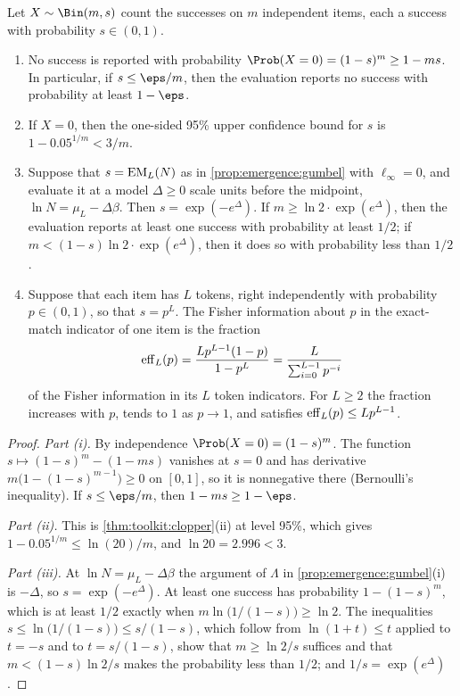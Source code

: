 \begin{refsection}
\begin{proposition}\label{prop:emergence:resolution}
Let $X\sim\Bin(m,s)$ count the successes on $m$ independent items, each a success with probability $s\in(0,1)$.
\begin{enumerate}
\item No success is reported with probability $\Prob(X=0)=(1-s)^m\ge1-ms$. In particular, if $s\le\eps/m$, then the evaluation reports no success with probability at least $1-\eps$.
\item If $X=0$, then the one-sided 95\% upper confidence bound for $s$ is $1-0.05^{1/m}<3/m$.
\item Suppose that $s=\mathrm{EM}_L(N)$ as in \cref{prop:emergence:gumbel} with $\ell_\infty=0$, and evaluate it at a model $\Delta\ge0$ scale units before the midpoint, $\ln N=\mu_L-\Delta\beta$. Then $s=\exp(-e^\Delta)$. If $m\ge\ln2\cdot\exp(e^\Delta)$, then the evaluation reports at least one success with probability at least $1/2$; if $m<(1-s)\ln2\cdot\exp(e^\Delta)$, then it does so with probability less than $1/2$.
\item Suppose that each item has $L$ tokens, right independently with probability $p\in(0,1)$, so that $s=p^L$. The Fisher information about $p$ in the exact-match indicator of one item is the fraction
\begin{equation}\label{eq:emergence:eff}
\mathrm{eff}_L(p)=\frac{Lp^{L-1}(1-p)}{1-p^L}=\frac{L}{\sum_{i=0}^{L-1}p^{-i}}
\end{equation}
of the Fisher information in its $L$ token indicators. For $L\ge2$ the fraction increases with $p$, tends to $1$ as $p\to1$, and satisfies $\mathrm{eff}_L(p)\le Lp^{L-1}$.
\end{enumerate}
\end{proposition}

\begin{proof}
\emph{Part (i).} By independence $\Prob(X=0)=(1-s)^m$. The function $s\mapsto(1-s)^m-(1-ms)$ vanishes at $s=0$ and has derivative $m\bigl(1-(1-s)^{m-1}\bigr)\ge0$ on $[0,1]$, so it is nonnegative there (Bernoulli's inequality). If $s\le\eps/m$, then $1-ms\ge1-\eps$.

\emph{Part (ii).} This is \cref{thm:toolkit:clopper}(ii) at level 95\%, which gives $1-0.05^{1/m}\le\ln(20)/m$, and $\ln20=2.996<3$.

\emph{Part (iii).} At $\ln N=\mu_L-\Delta\beta$ the argument of $\Lambda$ in \cref{prop:emergence:gumbel}(i) is $-\Delta$, so $s=\exp(-e^{\Delta})$. At least one success has probability $1-(1-s)^m$, which is at least $1/2$ exactly when $m\ln\bigl(1/(1-s)\bigr)\ge\ln2$. The inequalities $s\le\ln\bigl(1/(1-s)\bigr)\le s/(1-s)$, which follow from $\ln(1+t)\le t$ applied to $t=-s$ and to $t=s/(1-s)$, show that $m\ge\ln2/s$ suffices and that $m<(1-s)\ln2/s$ makes the probability less than $1/2$; and $1/s=\exp(e^\Delta)$.


\end{proof}
\end{refsection}
